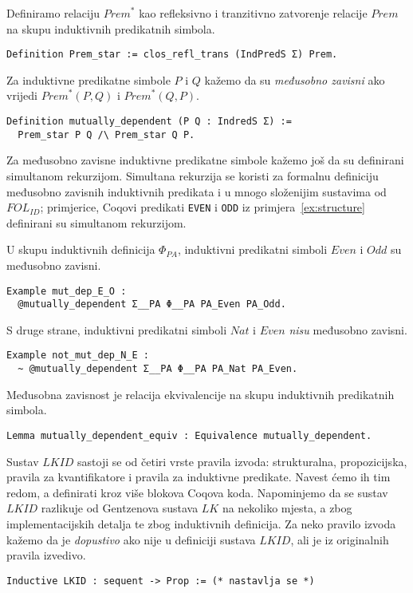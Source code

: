 \begin{definition}
  Definiramo relaciju \(\mathit{Prem}^{\ast}\) kao refleksivno i tranzitivno zatvorenje relacije \(\mathit{Prem}\) na skupu induktivnih predikatnih simbola.
\begin{verbatim}
Definition Prem_star := clos_refl_trans (IndPredS Σ) Prem.
\end{verbatim}
  \noindent Za induktivne predikatne simbole \(P\) i \(Q\) kažemo da su
  \textit{međusobno zavisni} ako vrijedi \(\mathit{Prem}^{\ast}(P, Q)\) i \(\mathit{Prem}^{\ast}(Q, P)\).
\begin{verbatim}
Definition mutually_dependent (P Q : IndredS Σ) :=
  Prem_star P Q /\ Prem_star Q P.
\end{verbatim}
  \noindent Za međusobno zavisne induktivne predikatne simbole kažemo još da su
  definirani simultanom rekurzijom.
  Simultana rekurzija se koristi za formalnu definiciju međusobno zavisnih induktivnih predikata
  i u mnogo složenijim sustavima od \(\mathit{FOL}_{\mathit{ID}}\); primjerice,
  Coqovi predikati \texttt{EVEN} i \texttt{ODD} iz primjera~\ref{ex:structure}
  definirani su simultanom rekurzijom.
\end{definition}

\begin{example}
  U skupu induktivnih definicija \(\Phi_{\mathit{PA}}\),
  induktivni predikatni simboli \(\mathit{Even}\) i \(\mathit{Odd}\)
  su međusobno zavisni.
\begin{verbatim}
Example mut_dep_E_O :
  @mutually_dependent Σ__PA Φ__PA PA_Even PA_Odd.
\end{verbatim}
  \noindent S druge strane, induktivni predikatni simboli \(\mathit{Nat}\) i \(\mathit{Even}\)
  \textit{nisu} međusobno zavisni.
\begin{verbatim}
Example not_mut_dep_N_E :
  ~ @mutually_dependent Σ__PA Φ__PA PA_Nat PA_Even.
\end{verbatim}
\end{example}

\begin{lemma}
  Međusobna zavisnost je relacija ekvivalencije na skupu induktivnih predikatnih simbola.
\begin{verbatim}
Lemma mutually_dependent_equiv : Equivalence mutually_dependent.
\end{verbatim}
\end{lemma}

Sustav \(\mathit{LKID}\) sastoji se od četiri vrste pravila izvoda:
strukturalna, propozicijska, pravila za kvantifikatore i pravila za induktivne predikate.
Navest ćemo ih tim redom, a definirati kroz više blokova Coqova koda.
Napominjemo da se sustav \(\mathit{LKID}\) razlikuje od Gentzenova sustava \(\mathit{LK}\)
na nekoliko mjesta, a zbog implementacijskih detalja te zbog induktivnih definicija.
Za neko pravilo izvoda kažemo da je \textit{dopustivo} ako nije u definiciji sustava \(\mathit{LKID}\),
ali je iz originalnih pravila izvedivo.
\begin{verbatim}
Inductive LKID : sequent -> Prop := (* nastavlja se *)
\end{verbatim}
